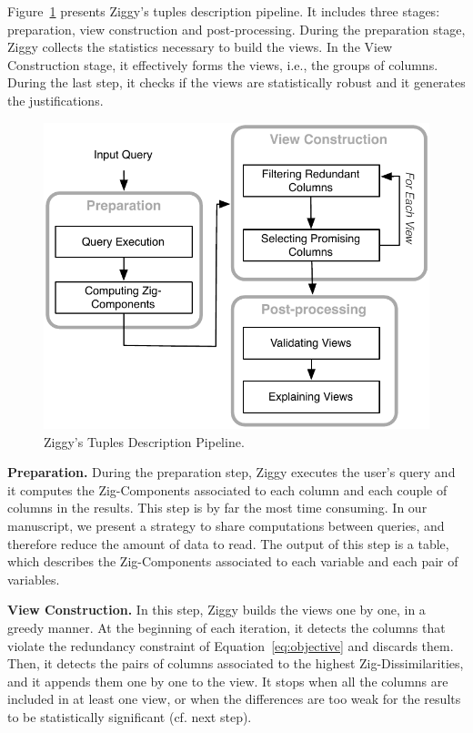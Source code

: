 Figure~\ref{fig:architecture} presents Ziggy's tuples description pipeline.  It
includes three stages: preparation, view construction and post-processing.
During the preparation stage, Ziggy collects the statistics necessary to build
the views. In the View Construction stage, it effectively forms the views,
i.e., the groups of columns. During the last step, it checks if the views are
statistically robust and it generates the justifications.
\begin{figure}[t!]
    \centering
    \includegraphics[width=\columnwidth]{Images/Algorithm}
    \caption{Ziggy's Tuples Description Pipeline.}
    \label{fig:architecture}
\end{figure}

\textbf{Preparation.} During the preparation step, Ziggy executes the user's
query and it computes the Zig-Components associated to each column and each
couple of columns in the results. This step is by far the most time consuming.
In our manuscript, we present a strategy to share computations between queries,
and therefore reduce the amount of data to read. The output of this step is a
table, which describes the Zig-Components associated to each variable and each
pair of variables.

\textbf{View Construction.} In this step, Ziggy builds the views one by one, in
a greedy manner. At the beginning of each iteration, it detects the columns
that violate the redundancy constraint of Equation~\ref{eq:objective} and
discards them. Then, it detects the pairs of columns associated to the highest
Zig-Dissimilarities, and it appends them one by one to the view. It stops when
all the columns are included in at least one view, or when the differences are
too weak for the results to be statistically significant (cf. next step).

